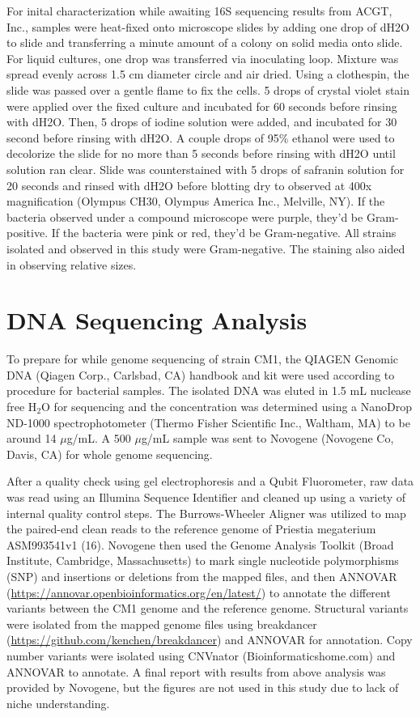 \documentclass[12pt,twoside]{reedthesis}
\begin{document}
For inital characterization while awaiting 16S sequencing results from ACGT, Inc., samples were heat-fixed onto microscope slides by adding one drop of dH2O to slide and transferring a minute amount of a colony on solid media onto slide. For liquid cultures, one drop was transferred via inoculating loop. Mixture was spread evenly across 1.5 cm diameter circle and air dried. Using a clothespin, the slide was passed over a gentle flame to fix the cells. 5 drops of crystal violet stain were applied over the fixed culture and incubated for 60 seconds before rinsing with dH2O. Then, 5 drops of iodine solution were added, and incubated for 30 second before rinsing with dH2O. A couple drops of 95\% ethanol were used to decolorize the slide for no more than 5 seconds before rinsing with dH2O until solution ran clear. Slide was counterstained with 5 drops of safranin solution for 20 seconds and rinsed with dH2O before blotting dry to observed at 400x magnification (Olympus CH30, Olympus America Inc., Melville, NY). If the bacteria observed under a compound microscope were purple, they'd be Gram-positive. If the bacteria were pink or red, they'd be Gram-negative. All strains isolated and observed in this study were Gram-negative. The staining also aided in observing relative sizes.

\hypertarget{dna-sequencing-analysis}{%
\section{DNA Sequencing Analysis}\label{dna-sequencing-analysis}}

To prepare for while genome sequencing of strain CM1, the QIAGEN Genomic DNA (Qiagen Corp., Carlsbad, CA) handbook and kit were used according to procedure for bacterial samples. The isolated DNA was eluted in 1.5 mL nuclease free H\(_2\)O for sequencing and the concentration was determined using a NanoDrop ND-1000 spectrophotometer (Thermo Fisher Scientific Inc., Waltham, MA) to be around 14 \(\mu\)g/mL. A 500 \(\mu\)g/mL sample was sent to Novogene (Novogene Co, Davis, CA) for whole genome sequencing.

After a quality check using gel electrophoresis and a Qubit Fluorometer, raw data was read using an Illumina Sequence Identifier and cleaned up using a variety of internal quality control steps. The Burrows-Wheeler Aligner was utilized to map the paired-end clean reads to the reference genome of Priestia megaterium ASM993541v1 (16). Novogene then used the Genome Analysis Toolkit (Broad Institute, Cambridge, Massachusetts) to mark single nucleotide polymorphisms (SNP) and insertions or deletions from the mapped files, and then ANNOVAR (\url{https://annovar.openbioinformatics.org/en/latest/}) to annotate the different variants between the CM1 genome and the reference genome. Structural variants were isolated from the mapped genome files using breakdancer (\url{https://github.com/kenchen/breakdancer}) and ANNOVAR for annotation. Copy number variants were isolated using CNVnator (Bioinformaticshome.com) and ANNOVAR to annotate. A final report with results from above analysis was provided by Novogene, but the figures are not used in this study due to lack of niche understanding.
\end{document}
